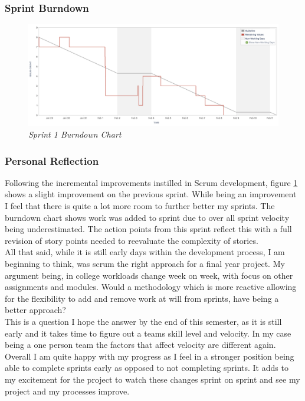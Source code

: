 \subsubsection{Sprint Burndown}
\begin{figure}[!ht]
\centering
\includegraphics*[width=0.8
\textwidth]{images/sprint-2.png}
\caption{\em Sprint 1 Burndown Chart}
\label{img:bd2}
\end{figure}
\subsubsection{Personal Reflection}
Following the incremental improvements instilled in Scrum development, figure \ref{img:bd2} shows a slight improvement on the previous sprint. While being an improvement I feel that there is quite a lot more room to further better my sprints. The burndown chart shows work was added to sprint due to over all sprint velocity being underestimated. The action points from this sprint reflect this with a full revision of story points needed to reevaluate the complexity of stories.
\\All that said, while it is still early days within the development process, I am beginning to think, was scrum the right approach for a final year project. My argument being, in college workloads change week on week, with focus on other assignments and modules. Would a methodology which is more reactive allowing for the flexibility to add and remove work at will from sprints, have being a better approach? \\ This is a question I hope the answer by the end of this semester, as it is still early and it takes time to figure out a teams skill level and velocity. In my case being a one person team the factors that affect velocity are different again. Overall I am quite happy with my progress as I feel in a stronger position being able to complete sprints early as opposed to not completing sprints. It adds to my excitement for the project to watch these changes sprint on sprint and see my project and my processes improve.

